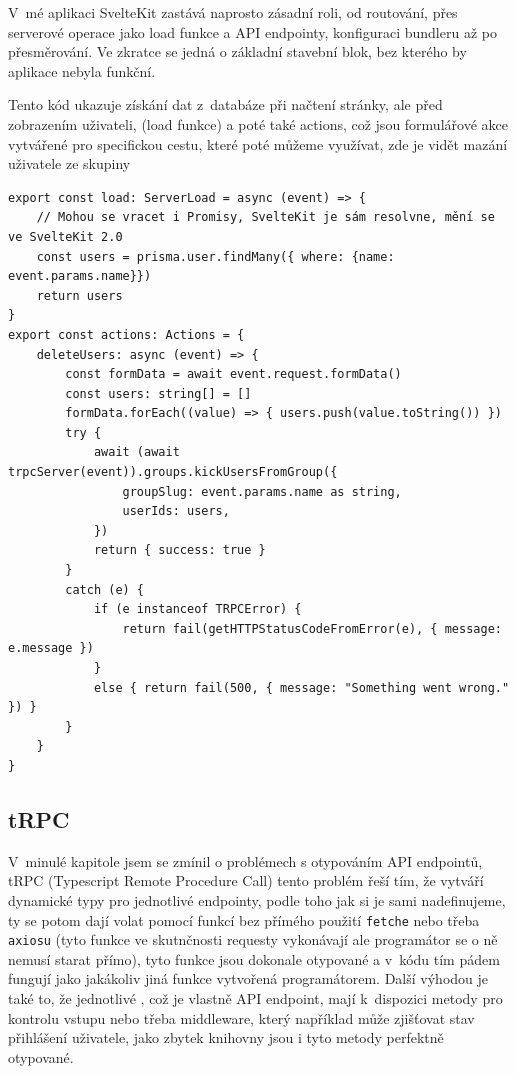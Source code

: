 \documentclass[12pt, a4paper,
openright
]{report}
\begin{document}
V~mé aplikaci SvelteKit zastává naprosto zásadní roli, od routování, přes serverové operace jako load funkce a API endpointy, konfiguraci bundleru až po přesměrování. Ve zkratce se jedná o základní stavební blok, bez kterého by aplikace nebyla funkční.

Tento kód ukazuje získání dat z~databáze při načtení stránky, ale před zobrazením uživateli, (load funkce) a poté také actions, což jsou formulářové akce vytvářené pro specifickou cestu, které poté můžeme využívat, zde je vidět mazání uživatele ze skupiny
\begin{lstlisting}[style=ES6, caption=Ukázka z +page.server.ts, label=sveltekit_code]
export const load: ServerLoad = async (event) => {
	// Mohou se vracet i Promisy, SvelteKit je sám resolvne, mění se ve SvelteKit 2.0
	const users = prisma.user.findMany({ where: {name: event.params.name}})
	return users
}
export const actions: Actions = {
	deleteUsers: async (event) => {
		const formData = await event.request.formData()
		const users: string[] = []
		formData.forEach((value) => { users.push(value.toString()) })
		try {
			await (await trpcServer(event)).groups.kickUsersFromGroup({
				groupSlug: event.params.name as string,
				userIds: users,
			})
			return { success: true }
		}
		catch (e) {
			if (e instanceof TRPCError) {
				return fail(getHTTPStatusCodeFromError(e), { message: e.message })
			}
			else { return fail(500, { message: "Something went wrong." }) }
		}
	}
}
\end{lstlisting}

\subsection{tRPC}
V~minulé kapitole jsem se zmínil o problémech s otypováním API endpointů, tRPC (Typescript Remote Procedure Call) tento problém řeší tím, že vytváří dynamické typy pro jednotlivé endpointy, podle toho jak si je sami nadefinujeme, ty se potom dají volat pomocí funkcí bez přímého použití \texttt{fetche} nebo třeba \texttt{axiosu} (tyto funkce ve skutnčnosti  requesty vykonávají ale programátor se o ně nemusí starat přímo), tyto funkce jsou dokonale otypované a v~kódu tím pádem fungují jako jakákoliv jiná funkce vytvořená programátorem. Další výhodou je také to, že jednotlivé , což je vlastně API endpoint, mají k~dispozici metody pro kontrolu vstupu nebo třeba middleware, který například může zjišťovat stav přihlášení uživatele, jako zbytek knihovny jsou i tyto metody perfektně otypované.
\end{document}
